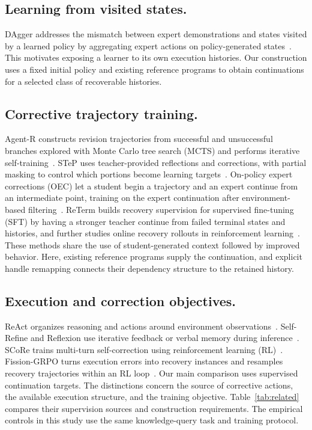 \documentclass[a4paper,12pt]{article}
\begin{document}
\subsection{Learning from visited states.}
DAgger addresses the mismatch between expert demonstrations and states visited by a learned policy by aggregating expert actions on policy-generated states~\cite{ross2011dagger}. This motivates exposing a learner to its own execution histories. Our construction uses a fixed initial policy and existing reference programs to obtain continuations for a selected class of recoverable histories.

\subsection{Corrective trajectory training.}
Agent-R constructs revision trajectories from successful and unsuccessful branches explored with Monte Carlo tree search (MCTS) and performs iterative self-training~\cite{yuan2025agentr}. STeP uses teacher-provided reflections and corrections, with partial masking to control which portions become learning targets~\cite{chen2025step}. On-policy expert corrections (OEC) let a student begin a trajectory and an expert continue from an intermediate point, training on the expert continuation after environment-based filtering~\cite{lauffer2025oec}. ReTerm builds recovery supervision for supervised fine-tuning (SFT) by having a stronger teacher continue from failed terminal states and histories, and further studies online recovery rollouts in reinforcement learning~\cite{xie2026reterm}. These methods share the use of student-generated context followed by improved behavior. Here, existing reference programs supply the continuation, and explicit handle remapping connects their dependency structure to the retained history.

\subsection{Execution and correction objectives.}
ReAct organizes reasoning and actions around environment observations~\cite{yao2023react}. Self-Refine and Reflexion use iterative feedback or verbal memory during inference~\cite{madaan2023selfrefine,shinn2023reflexion}. SCoRe trains multi-turn self-correction using reinforcement learning (RL)~\cite{kumar2025score}. Fission-GRPO turns execution errors into recovery instances and resamples recovery trajectories within an RL loop~\cite{zhang2026fission}. Our main comparison uses supervised continuation targets. The distinctions concern the source of corrective actions, the available execution structure, and the training objective. Table~\ref{tab:related} compares their supervision sources and construction requirements. The empirical controls in this study use the same knowledge-query task and training protocol.
\end{document}
